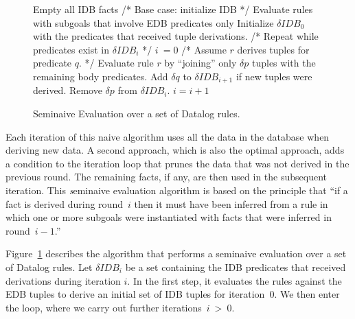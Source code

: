 \begin{figure}
\ssp
\begin{boxedminipage}{\linewidth}
    \begin{algorithmic}[1]
      	\STATE Empty all IDB facts
	\STATE /* Base case: initialize IDB */
        \STATE Evaluate rules with subgoals that involve EDB predicates only
	\STATE Initialize $\delta IDB_0$ with the predicates that received tuple derivations.
	\STATE /* Repeat while predicates exist in $\delta IDB_i$ */
	\STATE $i\ = 0$
                	\STATE /* Assume $r$ derives tuples for predicate $q$.  */
			\STATE Evaluate rule $r$ by ``joining'' only $\delta p$ tuples with the remaining body predicates. 
			\STATE Add $\delta q$ to $\delta IDB_{i+1}$ if new tuples were derived.
			\STATE Remove $\delta p$ from $\delta IDB_i$.
        	\ENDFOR
        \ENDFOR
	\STATE $i = i + 1$
	\ENDWHILE
    \end{algorithmic}
\end{boxedminipage}
\caption{\label{ch:p2:fig:seminaive}Seminaive Evaluation over a set of Datalog rules.}
\end{figure}

Each iteration of this naive algorithm uses all the data in the database when
deriving new data.  A second approach, which is also the optimal approach, adds
a condition to the iteration loop that prunes the data that was not derived in
the previous round.  The remaining facts, if any, are then used in the
subsequent iteration.  This {\emph seminaive evaluation} algorithm is based on
the principle that ``if a fact is derived during round~$i$ then it must have been
inferred from a rule in which one or more subgoals were instantiated with facts
that were inferred in round~$i-1$.''~\cite{ullmanbook}

Figure~\ref{ch:p2:fig:seminaive} describes the algorithm that performs a
seminaive evaluation over a set of Datalog rules.  Let $\delta IDB_{i}$ be a
set containing the IDB predicates that received derivations during iteration
$i$.  In the first step, it evaluates the rules against the EDB tuples to
derive an initial set of IDB tuples for iteration~$0$.  We then enter the loop,
where we carry out further iterations~$i\ >\ 0$.

